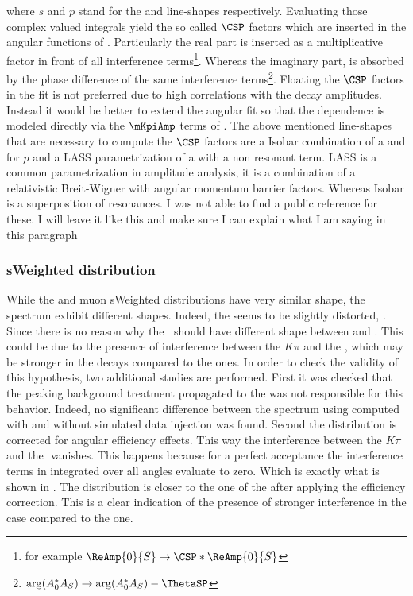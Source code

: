 \noindent where $s$ and $p$ stand for the \swave and \pwave line-shapes respectively. Evaluating those complex valued integrals yield
the so called $\CSP$ factors which are inserted in the angular functions of . Particularly the real part is inserted
as a multiplicative factor in front of all \spwave interference
terms\footnote{for example $\ReAmp{0}{S} \rightarrow \CSP * \ReAmp{0}{S} $}.
Whereas the imaginary part, is absorbed by the phase difference of the same interference
terms\footnote{ $\arg(A_0^*A_S) \rightarrow \arg(A_0^*A_S) - \ThetaSP$}. Floating the $\CSP$ factors in the fit is not preferred due
to high correlations with the decay amplitudes. Instead it would be better to extend the angular fit so that the \mkpi dependence
is modeled directly via the $\mKpiAmp$ terms of . The above mentioned \swave line-shapes that are necessary
to compute the $\CSP$ factors are a Isobar combination of a \KstENT and \KstOFOZ for $p$ and a LASS parametrization of a \KstOFTZ
with a non resonant term. LASS is a common \swave parametrization in amplitude analysis, it is a combination of a relativistic Breit-Wigner
with angular momentum barrier factors. Whereas Isobar is a superposition of resonances. {\color{red}I was not able to find a public reference for these. I
 will leave it like this and make sure I can explain what I am saying in this paragraph }


\subsubsection{sWeighted \mkpi distribution}
While the \Bs and \Bd muon sWeighted distributions have very similar shape, the \mkpi spectrum exhibit different shapes.
Indeed, the \Bs \mkpi \sPlot seems to be slightly distorted, . Since there is no reason why the \Kst$~$\pwave
should have different shape between \BsJpsiKst and \BdJpsiKst. This could be due to the presence of interference between
the $K\pi$ \swave and the \Kstarz, which may be stronger in the \Bs decays compared to the \Bd ones. In order
to check the validity of this hypothesis, two additional studies are performed. First it was checked that the peaking
background treatment propagated to the \sWeights was not responsible for this behavior. Indeed, no significant difference
between the \Bs \mkpi spectrum using \sWeights computed with and without simulated data injection was found. Second the \mkpi
distribution is corrected for angular efficiency effects. This way the interference between the $K\pi$ \swave and the
\Kstarz $ $ \pwave vanishes. This happens because for a perfect acceptance the interference terms in  integrated over all angles
evaluate to zero. Which is exactly what is shown in . The \Bs \mkpi distribution is closer to the one of the \Bd after applying
the efficiency correction. This is a clear indication of the presence of stronger interference in the \Bs case compared to the \Bd one.

